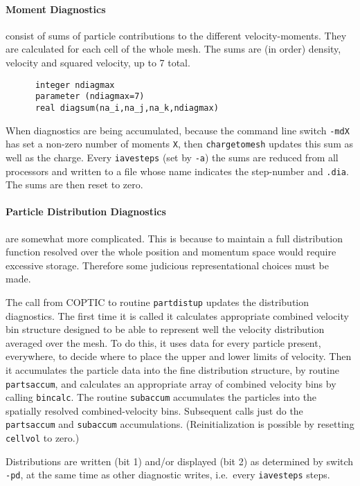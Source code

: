 \documentclass[12pt]{article}
\begin{document}
\paragraph{Moment Diagnostics} consist of sums of particle
contributions to the different velocity-moments. They are calculated
 for each cell of the whole mesh. The sums are (in order) density,
 velocity and squared velocity, up to 7 total.
\begin{verbatim}
      integer ndiagmax
      parameter (ndiagmax=7)
      real diagsum(na_i,na_j,na_k,ndiagmax)
\end{verbatim}
When diagnostics are being accumulated, because the command line
switch \verb!-mdX! has set a non-zero number of moments \verb!X!, then
\verb!chargetomesh! updates this sum as well as the charge. Every
\verb!iavesteps! (set by \verb!-a!) the sums are reduced from all
processors and written to a file whose name indicates the step-number
and \verb!.dia!. The sums are then reset to zero.

\paragraph{Particle Distribution Diagnostics} are somewhat more
complicated. This is because to maintain a full distribution function
resolved over the whole position and momentum space would require
excessive storage. Therefore some judicious representational choices
must be made. 

The call from COPTIC to routine \verb!partdistup! updates
the distribution diagnostics. The first time it is called it
calculates appropriate combined velocity bin structure designed to be able to
represent well the velocity distribution averaged over the mesh. To do
this, it uses data for every particle present, everywhere, to decide
where to place the upper and lower limits of velocity. Then it
accumulates the particle data into the fine distribution structure, by
routine \verb!partsaccum!, and calculates an appropriate array of
combined velocity bins by calling \verb!bincalc!. The routine
\verb!subaccum! accumulates the particles into the spatially resolved
combined-velocity bins. Subsequent calls just do the \verb!partsaccum!
and \verb!subaccum! accumulations. (Reinitialization is possible by
resetting \verb!cellvol! to zero.)

Distributions are written (bit 1) and/or displayed (bit 2) as
determined by switch \verb!-pd!, at the same time as other diagnostic
writes, i.e.\ every \verb!iavesteps! steps. 
\end{document}
